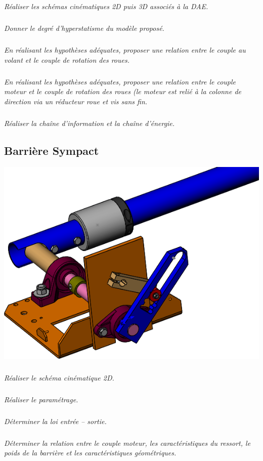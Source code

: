 \documentclass[10pt,fleqn]{article} %
\begin{document}
\begin{multicols}{2}
\subparagraph{}
\textit{Réaliser les schémas cinématiques 2D puis 3D associés à la DAE.}

\subparagraph{}
\textit{Donner le degré d’hyperstatisme du modèle proposé.}

\subparagraph{}
\textit{En réalisant les hypothèses adéquates, proposer une relation entre le couple au volant et le couple de rotation des roues.}


\subparagraph{}
\textit{En réalisant les hypothèses adéquates, proposer une relation entre le couple moteur et le couple de rotation des roues (le moteur est relié à la colonne de direction via un réducteur roue et vis sans fin.}


\subparagraph{}
\textit{Réaliser la chaîne d'information et la chaîne d'énergie.}


\subsection*{Barrière Sympact}
\setcounter{exo}{0}
\begin{center}
\includegraphics[width=\linewidth]{images/sympact_01}
\end{center}

\subparagraph{}
\textit{Réaliser le schéma cinématique 2D.}

\subparagraph{}
\textit{Réaliser le paramétrage.}


\subparagraph{}
\textit{Déterminer la loi entrée -- sortie.}



\subparagraph{}
\textit{Déterminer la relation entre le couple moteur, les caractéristiques du ressort, le poids de la barrière et les caractéristiques géométriques. }


\end{multicols}
\end{document}
